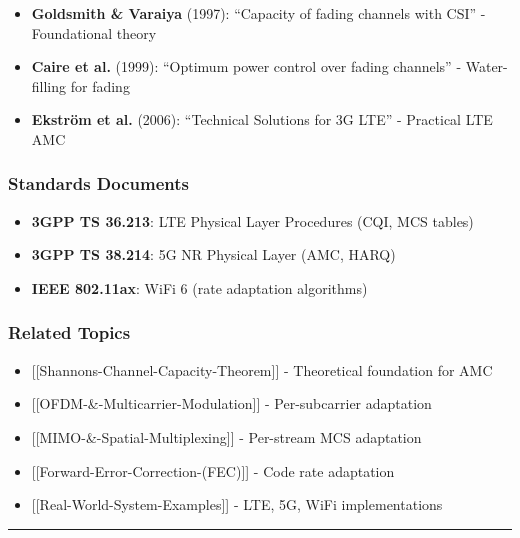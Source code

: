 \begin{itemize}
\tightlist
\item
  \textbf{Goldsmith \& Varaiya} (1997): ``Capacity of fading channels
  with CSI'' - Foundational theory
\item
  \textbf{Caire et al.} (1999): ``Optimum power control over fading
  channels'' - Water-filling for fading
\item
  \textbf{Ekström et al.} (2006): ``Technical Solutions for 3G LTE'' -
  Practical LTE AMC
\end{itemize}

\subsubsection{Standards Documents}\label{standards-documents}

\begin{itemize}
\tightlist
\item
  \textbf{3GPP TS 36.213}: LTE Physical Layer Procedures (CQI, MCS
  tables)
\item
  \textbf{3GPP TS 38.214}: 5G NR Physical Layer (AMC, HARQ)
\item
  \textbf{IEEE 802.11ax}: WiFi 6 (rate adaptation algorithms)
\end{itemize}

\subsubsection{Related Topics}\label{related-topics}

\begin{itemize}
\tightlist
\item
  {[}{[}Shannon\textquotesingle s-Channel-Capacity-Theorem{]}{]} -
  Theoretical foundation for AMC
\item
  {[}{[}OFDM-\&-Multicarrier-Modulation{]}{]} - Per-subcarrier
  adaptation
\item
  {[}{[}MIMO-\&-Spatial-Multiplexing{]}{]} - Per-stream MCS adaptation
\item
  {[}{[}Forward-Error-Correction-(FEC){]}{]} - Code rate adaptation
\item
  {[}{[}Real-World-System-Examples{]}{]} - LTE, 5G, WiFi implementations
\end{itemize}

\begin{center}\rule{0.5\linewidth}{0.5pt}\end{center}

